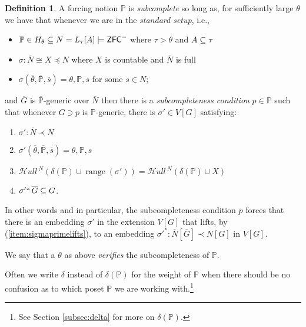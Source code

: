 \documentclass{amsart}
\newtheorem{proposition}[theorem]{Proposition}
\theoremstyle{definition}
\newtheorem{definition}[theorem]{Definition}
\theoremstyle{remark}
\renewcommand{\P}{\mathbb{P}}
\newcommand{\N}{{\overline{N}}}
\newcommand{\G}{\overline{G}}
\newcommand{\ZFC}{\textup{\ensuremath{\textsf{ZFC}}}}
\DeclareMathOperator{\ran}{range}
\newcommand{\SH}{\mathcal{H}\textit{ull} \,}
\newcommand{\sk}[3]{\SH^{#1}( {#2} \cup {\ran(#3)} ) }
\newcommand{\Sk}[3]{\SH^{#1}( {#2} \cup {#3} ) }
\begin{document}
\begin{definition} \label{definition:SC}
A forcing notion $\P$ is \emph{subcomplete} so long as,
for sufficiently large $\theta$ we have that whenever we are in the \emph{standard setup}, i.e., \begin{itemize}
	\item $\P \in H_\theta \subseteq N = L_\tau[A] \models \ZFC^-$ where $\tau>\theta$ and $A \subseteq \tau$
	\item $\sigma: \N \cong X \preccurlyeq N$ where $X$ is countable and $\N$ is full
	\item $\sigma(\overline \theta, \overline{\P}, \overline s)=\theta, \P, s$ for some $s \in N$;
\end{itemize}
and $\G$ is  $\overline{\P}$-generic over $\N$ then there is a \emph{subcompleteness condition} $p \in \P$ such that whenever $G \ni p$ is $\P$-generic, there is $\sigma' \in V[G]$ satisfying: \begin{enumerate}
	\item $\sigma': \N \prec N$
	\item $\sigma'(\overline \theta, \overline{\P}, \overline s)=\theta, \P, s$
	\item \label{item:skolemcompatibility} $\sk{N}{\delta(\P)}{\sigma'} = \Sk{N}{\delta(\P)}{X}$
	\item \label{item:sigmaprimelifts} $\sigma'``\, \G \subseteq G$.
\end{enumerate}
In other words and in particular, the subcompleteness condition $p$ forces that there is an embedding $\sigma'$ in the extension $V[G]$ that lifts, by (\ref{item:sigmaprimelifts}), to an embedding $\sigma'^*:\N[\G] \prec N[G]$ in $V[G]$.

We say that a $\theta$ as above \emph{verifies} the subcompleteness of $\P$.

Often we write $\delta$ instead of $\delta(\P)$ for the weight of $\P$ when there should be no confusion as to which poset $\P$ we are working with.\footnote{See Section \ref{subsec:delta} for more on $\delta(\P)$.}
\end{definition}
%
\end{document}
